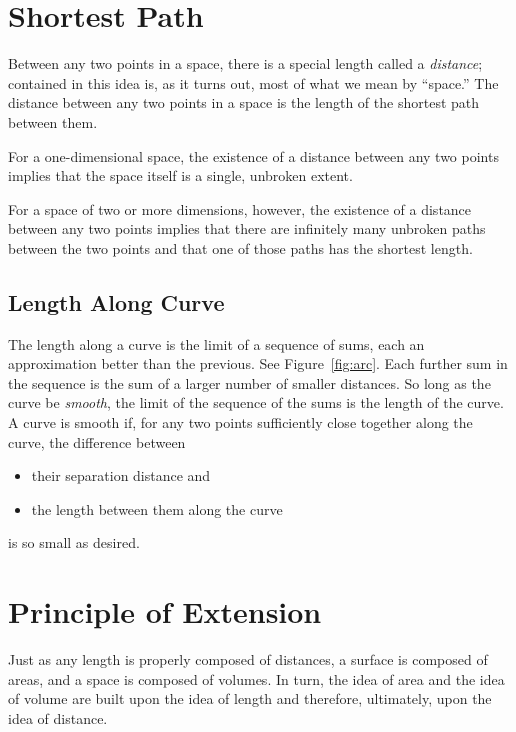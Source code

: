 \documentclass[twocolumn,10pt]{book}
\begin{document}
\section{Shortest Path}

Between any two points in a space, there is a special length called a
\emph{distance}; contained in this idea is, as it turns out, most of what we
mean by ``space.'' The distance between any two points in a space is the length
of the shortest path between them.

For a one-dimensional space, the existence of a distance between any two points
implies that the space itself is a single, unbroken extent.

For a space of two or more dimensions, however, the existence of a distance
between any two points implies that there are infinitely many unbroken paths
between the two points and that one of those paths has the shortest
length.

\subsection{Length Along Curve}

The length along a curve is the limit of a sequence of sums, each an
approximation better than the previous.  See Figure~\ref{fig:arc}.  Each
further sum in the sequence is the sum of a larger number of smaller distances.
So long as the curve be \emph{smooth}, the limit of the sequence of the sums is
the length of the curve.  A curve is smooth if, for any two points sufficiently
close together along the curve, the difference between
\begin{itemize}
   \item their separation distance and
   \item the length between them along the curve
\end{itemize}
is so small as desired.

\section{Principle of Extension}

Just as any length is properly composed of distances, a surface is composed of
areas, and a space is composed of volumes.  In turn, the idea of area and the
idea of volume are built upon the idea of length and therefore, ultimately,
upon the idea of distance.
\end{document}
